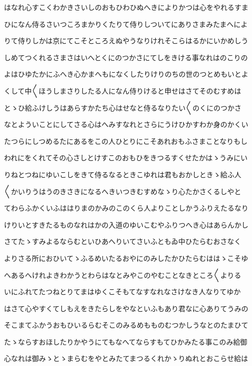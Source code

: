 \documentclass[a4paper,11pt,landscape]{ltjtarticle}
\begin{document}
はなれ心すこくわかきさいしのおもひわひぬへきによりかつは心をやれるすま
\par\medskip
ひになん侍るさいつころまかりくたりて侍りしついてにありさまみたまへによ
\par\medskip
りて侍りしかは京にてこそところえぬやうなりけれそこらはるかにいかめしう
\par\medskip
しめてつくれるさまさはいへとくにのつかさにてしをきける事なれはのこりの
\par\medskip
よはひゆたかにふへき心かまへもになくしたりけりのちの世のつとめもいとよ
\par\medskip
くして中〱ほうしまさりしたる人になん侍りけると申せはさてそのむすめは
\par\medskip
とゝひ給ふけしうはあらすかたち心はせなと侍るなりたい〱のくにのつかさ
\par\medskip
なとよういことにしてさる心はへみすなれとさらにうけひかすわか身のかくい
\par\medskip
たつらにしつめるたにあるをこの人ひとりにこそあれおもふさまことなりもし
\par\medskip
われにをくれてその心さしとけすこのおもひをきつるすくせたかはゝうみにい
\par\medskip
りねとつねにゆいこしをきて侍るなるときこゆれは君もおかしときゝ給ふ人
\par\medskip
〱かいりうはうのきさきになるへきいつきむすめなゝり心たかさくるしやと
\par\medskip
てわらふかくいふははりまのかみのこのくら人よりことしかうふりえたるなり
\par\medskip
けりいとすきたるものなれはかの入道のゆいこむやふりつへき心はあらんかし
\par\medskip
さてたゝすみよるならむといひあへりいてさいふともゐ中ひたらむおさなく
\par\medskip
よりさる所におひいてゝふるめいたるおやにのみしたかひたらむははゝこそゆ
\par\medskip
へあるへけれよきわかうとわらはなとみやこのやむことなきところ〱よりる
\par\medskip
いにふれてたつねとりてまはゆくこそもてなすなれなさけなき人なりてゆか
\par\medskip
はさて心やすくてしもえをきたらしをやなといふもあり君なに心ありてうみの
\par\medskip
そこまてふかうおもひいるらむそこのみるめもものむつかしうなとのたまひて
\par\medskip
たゝならすおほしたりかやうにてもなへてならすもてひかみたる事このみ給御
\par\medskip
心なれは御みゝとゝまらむをやとみたてまつるくれかゝりぬれとおこらせ給は
\end{document}
